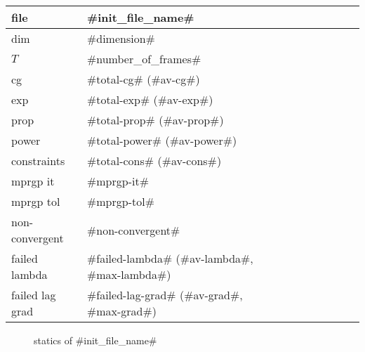 \begin{center}
  \begin{tabular}{|l*{8}{|l}}
    \hline
	file & #init_file_name# \\ \hline
	dim & #dimension# \\ \hline
	$T$ & #number_of_frames# \\ \hline
	cg & #total-cg# (#av-cg#) \\ \hline
	exp & #total-exp# (#av-exp#) \\ \hline
	prop & #total-prop# (#av-prop#) \\ \hline
	power & #total-power# (#av-power#) \\ \hline
    constraints & #total-cons# (#av-cons#) \\ \hline
    mprgp it & #mprgp-it# \\ \hline
	mprgp tol & #mprgp-tol# \\ \hline
    non-convergent & #non-convergent# \\ \hline
    failed lambda & #failed-lambda# (#av-lambda#, #max-lambda#)\\ \hline
    failed lag grad & #failed-lag-grad# (#av-grad#, #max-grad#) \\ \hline
  \end{tabular}
\end{center}


\begin{figure}
  \centering
  \caption{statics of #init_file_name#}
  \label{en_f}
\end{figure}
